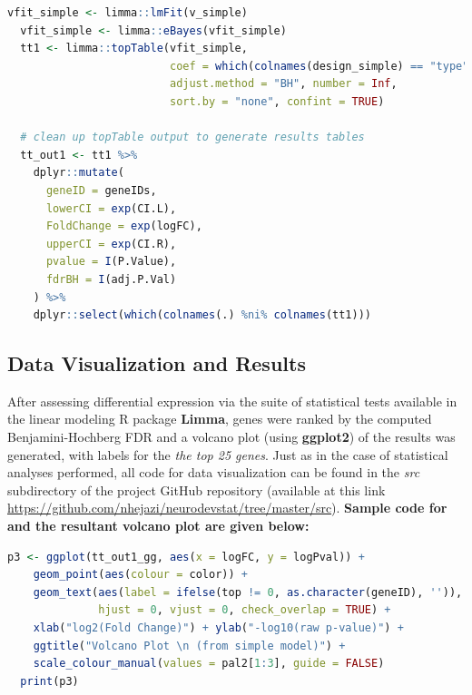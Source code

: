 \documentclass[11pt]{article}
\begin{document}
\begin{lstlisting}[language=R]
  vfit_simple <- limma::lmFit(v_simple)
  vfit_simple <- limma::eBayes(vfit_simple)
  tt1 <- limma::topTable(vfit_simple,
                         coef = which(colnames(design_simple) == "type"),
                         adjust.method = "BH", number = Inf,
                         sort.by = "none", confint = TRUE)

  # clean up topTable output to generate results tables
  tt_out1 <- tt1 %>%
    dplyr::mutate(
      geneID = geneIDs,
      lowerCI = exp(CI.L),
      FoldChange = exp(logFC),
      upperCI = exp(CI.R),
      pvalue = I(P.Value),
      fdrBH = I(adj.P.Val)
    ) %>%
    dplyr::select(which(colnames(.) %ni% colnames(tt1)))
\end{lstlisting}


\subsection{Data Visualization and Results}
After assessing differential expression via the suite of statistical tests
available in the linear modeling R package \textbf{Limma}, genes were ranked
by the computed Benjamini-Hochberg FDR and a volcano plot (using
\textbf{ggplot2}) of the results was generated, with labels for the \textit{the
top 25 genes}. Just as in the case of statistical analyses performed, all code
for data visualization can be found in  the \textit{src} subdirectory of the
project GitHub repository (available at this link
\url{https://github.com/nhejazi/neurodevstat/tree/master/src}). \textbf{Sample
code for and the resultant volcano plot are given below:}

\begin{lstlisting}[language=R]
  p3 <- ggplot(tt_out1_gg, aes(x = logFC, y = logPval)) +
    geom_point(aes(colour = color)) +
    geom_text(aes(label = ifelse(top != 0, as.character(geneID), '')),
              hjust = 0, vjust = 0, check_overlap = TRUE) +
    xlab("log2(Fold Change)") + ylab("-log10(raw p-value)") +
    ggtitle("Volcano Plot \n (from simple model)") +
    scale_colour_manual(values = pal2[1:3], guide = FALSE)
  print(p3)
\end{lstlisting}
\end{document}
